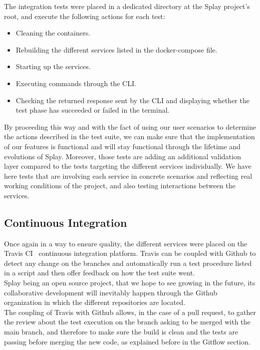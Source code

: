 \documentclass{eplmastersthesis}
\begin{document}
        The integration tests were placed in a dedicated directory at the Splay
        project's root, and execute the following actions for each test:

        \begin{itemize}
          \item Cleaning the containers.
          \item Rebuilding the different services listed in the docker-compose
          file.
          \item Starting up the services.
          \item Executing commands through the CLI.
          \item Checking the returned response sent by the CLI and displaying
          whether the test phase has succeeded or failed in the terminal.
        \end{itemize}

        By proceeding this way and with the fact of using our user scenarios to
        determine the actions described in the test suite, we can make sure
        that the implementation of our features is functional and will stay
        functional through the lifetime and evolutions of Splay. Moreover, those
        tests are adding an additional validation layer compared to the tests
        targeting the different services individually. We have here tests that
        are involving each service in concrete scenarios and reflecting real
        working conditions of the project, and also testing interactions
        between the services.

      \subsection{Continuous Integration}

        Once again in a way to ensure quality, the different services were placed
        on the Travis CI~\cite{travis} continuous integration platform. Travis
        can be coupled with Github to detect any change on the branches and
        automatically run a test procedure listed in a script and then offer
        feedback on how the test suite went.\\

        Splay being an open source project, that we hope to see growing in the
        future, its collaborative development will inevitably happen through
        the Github organization in which the different repositories are located.\\
        The coupling of Travis with Github allows, in the case of a pull request,
        to gather the review about the test execution on the branch asking to be
        merged with the main branch, and therefore to make sure the build is
        clean and the tests are passing before merging the new code, as
        explained before in the Gitflow section.
\end{document}
